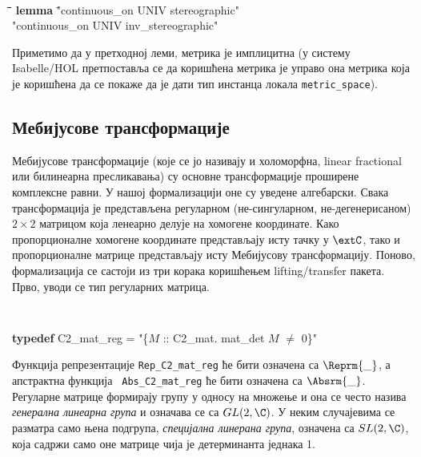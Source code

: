 {\tt
  \begin{tabbing}
    \hspace{5mm}\=\hspace{5mm}\=\hspace{5mm}\=\hspace{5mm}\=\hspace{5mm}\=\kill
{\bf lemma} \="continuous\_on UNIV stereographic" \\
\> "continuous\_on UNIV inv\_stereographic"
  \end{tabbing}
}


Приметимо да у претходној леми, метрика је имплицитна (у систему
Isabelle/HOL претпоставља се да коришћена метрика је управо она
метрика која је коришћена да се покаже да је дати тип инстанца локала
{\tt metric\_space}).

\subsection{Мебијусове трансформације}
\label{subsec:mobius}
Мебијусове трансформације (које се јо називају и холоморфна, linear
fractional или билинеарна пресликавања) су основне трансформације
проширене комплексне равни. У нашој формализацији оне су уведене
алгебарски. Свака трансформација је представљена регуларном
(не-сингуларном, не-дегенерисаном) $2\times 2$ матрицом која ленеарно
делује на хомогене координате. Како пропорционалне хомогене координате
представљају исту тачку у $\extC$, тако и пропорционалне матрице
представљају исту Мебијусову трансформацију. Поново, формализација се
састоји из три корака коришћењем lifting/transfer пакета. Прво, уводи
се тип регуларних матрица.

{\tt
\begin{tabbing}
{\bf typedef} C2\_mat\_reg = "\{$M$ :: C2\_mat. mat\_det $M$ $\neq$ 0\}"
\end{tabbing}
}

\noindent Функција репрезентације {\tt Rep\_C2\_mat\_reg} ће бити
означена са $\Reprm{\_}$, а апстрактна функција {\tt
  Abs\_C2\_mat\_reg} ће бити означена са $\Absrm{\_}$. Регуларне
матрице формирају групу у односу на множење и она се често назива
\emph{генерална линеарна група} и означава се са $GL(2, \C)$. У неким
случајевима се разматра само њена подгрупа, \emph{специјална линерана
  група}, означена са $SL(2, \C)$, која садржи само оне матрице чија
је детерминанта једнака 1.

